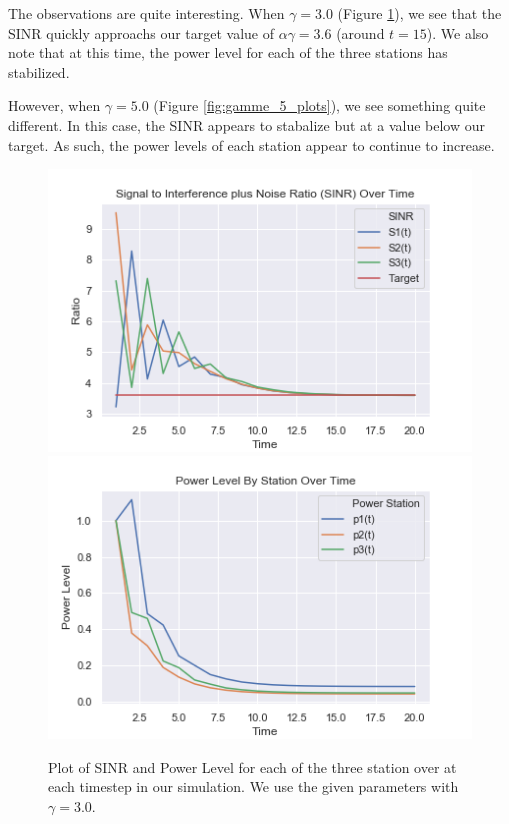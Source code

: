\documentclass[12pt]{exam}
\begin{document}
\begin{questions}
\begin{solution}
\begin{enumerate}[label=(\alph*)]
  The observations are quite interesting. When $\gamma = 3.0$ (Figure \ref{fig:gamme_3_plots}), we see that the SINR quickly approachs our target value of $\alpha \gamma = 3.6$ (around $t = 15$). We also note that at this time, the power level for each of the three stations has stabilized.

  However, when $\gamma = 5.0$ (Figure \ref{fig:gamme_5_plots}), we see something quite different. In this case, the SINR appears to stabalize but at a value below our target. As such, the power levels of each station appear to continue to increase.

\end{enumerate}
\end{solution}

\begin{figure}[!ht]
  \centering
  \includegraphics[scale=0.5]{figures/sinr_steps_20_gamma_3.png}
  \includegraphics[scale=0.5]{figures/power_level_steps_20_gamma_3.png}
  \caption{Plot of SINR and Power Level for each of the three station over at each timestep in our simulation. We use the given parameters with $\gamma = 3.0$.}
  \label{fig:gamme_3_plots}
\end{figure}


\end{questions}
\end{document}
